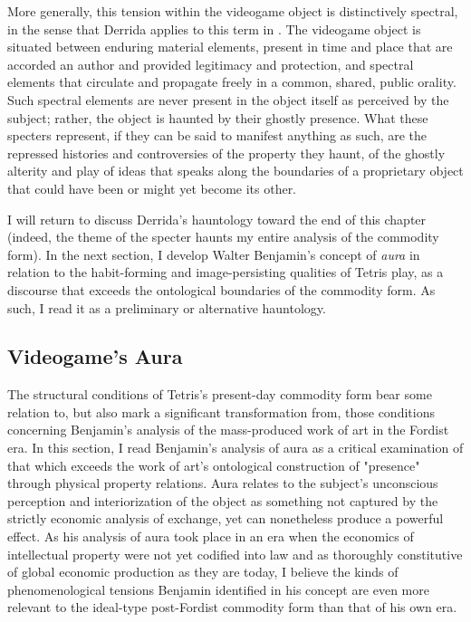 More generally, this tension within the videogame object is distinctively spectral, in the sense that Derrida applies to this term in . The videogame object is situated between enduring material elements, present in time and place that are accorded an author and provided legitimacy and protection, and spectral elements that circulate and propagate freely in a common, shared, public orality. Such spectral elements are never present in the object itself as perceived by the subject; rather, the object is haunted by their ghostly presence. What these specters represent, if they can be said to manifest anything as such, are the repressed histories and controversies of the property they haunt, of the ghostly alterity and play of ideas that speaks along the boundaries of a proprietary object that could have been or might yet become its other.

I will return to discuss Derrida's hauntology toward the end of this chapter (indeed, the theme of the specter haunts my entire analysis of the commodity form). In the next section, I develop Walter Benjamin's concept of \emph{aura} in relation to the habit-forming and image-persisting qualities of Tetris play, as a discourse that exceeds the ontological boundaries of the commodity form. As such, I read it as a preliminary or alternative hauntology.

\subsection*{Videogame's Aura}
The structural conditions of Tetris's present-day commodity form bear some relation to, but also mark a significant transformation from, those conditions concerning Benjamin's analysis of the mass-produced work of art in the Fordist era. In this section, I read Benjamin's analysis of aura as a critical examination of that which exceeds the work of art's ontological construction of "presence" through physical property relations. Aura relates to the subject's unconscious perception and interiorization of the object as something not captured by the strictly economic analysis of exchange, yet can nonetheless produce a powerful effect. As his analysis of aura took place in an era when the economics of intellectual property were not yet codified into law and as thoroughly constitutive of global economic production as they are today, I believe the kinds of phenomenological tensions Benjamin identified in his concept are even more relevant to the ideal-type post-Fordist commodity form than that of his own era.

